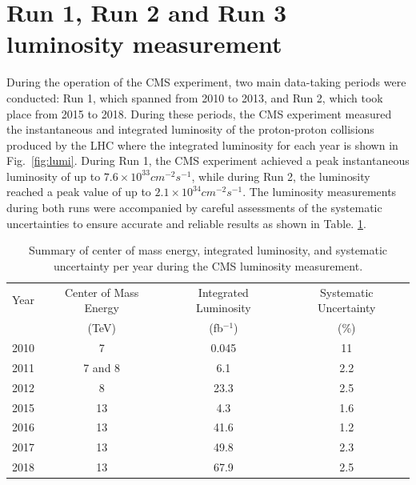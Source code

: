 \section{Run 1, Run 2 and Run 3 luminosity measurement}

During the operation of the CMS experiment, two main data-taking periods were conducted: Run 1, which spanned from 2010 to 2013, and Run 2, which took place from 2015 to 2018. During these periods, the CMS experiment measured the instantaneous and integrated luminosity of the proton-proton collisions produced by the LHC where the integrated luminosity for each year is shown in Fig.~\ref{fig:lumi}. During Run 1, the CMS experiment achieved a peak instantaneous luminosity of up to $7.6 \times 10^{33} cm^{-2} s^{-1}$, while during Run 2, the luminosity reached a peak value of up to $2.1 \times 10^{34} cm^{-2} s^{-1}$. The luminosity measurements during both runs were accompanied by careful assessments of the systematic uncertainties to ensure accurate and reliable results \cite{CMS-PAS-EWK-10-004, CMS-PAS-EWK-11-001, CMS-PAS-SMP-12-008, CMS-PAS-LUM-13-001, Sirunyan:2759951, pas_17, pas_18} as shown in Table. \ref{tab:lumi}.


\begin{table}[h]
  \centering
  \caption[Integrated luminosity and its precision for Run1 and Run2]{Summary of center of mass energy, integrated luminosity, and systematic uncertainty per year during the CMS luminosity measurement.}
\begin{tabular}{c c c c}
  Year & Center of Mass Energy & Integrated Luminosity & Systematic Uncertainty \\
  & (TeV) & (fb$^{-1}$) & (\%) \\
\hline
2010 & 7 & 0.045 & 11 \\
2011 & 7 and 8 & 6.1 & 2.2 \\
2012 & 8 & 23.3 & 2.5 \\
2015 & 13 & 4.3 & 1.6 \\
2016 & 13 & 41.6 & 1.2 \\
2017 & 13 & 49.8 & 2.3 \\
2018 & 13 & 67.9 &  2.5\\
\end{tabular}
\label{tab:lumi}
\end{table}


